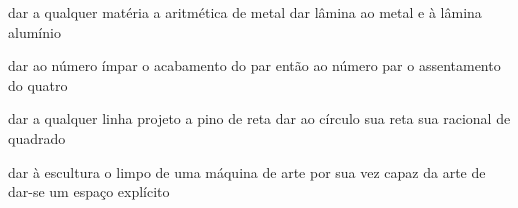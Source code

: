 \begin{poem}
\begin{stanza}
dar a qualquer matéria\verseline
a aritmética de metal\verseline
dar lâmina ao metal\verseline
e à lâmina alumínio
\end{stanza}
\begin{stanza}
dar ao número ímpar\verseline
o acabamento do par\verseline
então ao número par\verseline
o assentamento do quatro
\end{stanza}
\begin{stanza}
dar a qualquer linha\verseline
projeto a pino de reta\verseline
dar ao círculo sua reta\verseline
sua racional de quadrado
\end{stanza}
\begin{stanza}
dar à escultura o limpo\verseline
de uma máquina de arte\verseline
por sua vez capaz da arte\verseline
de dar-se um espaço explícito
\end{stanza}
\end{poem}